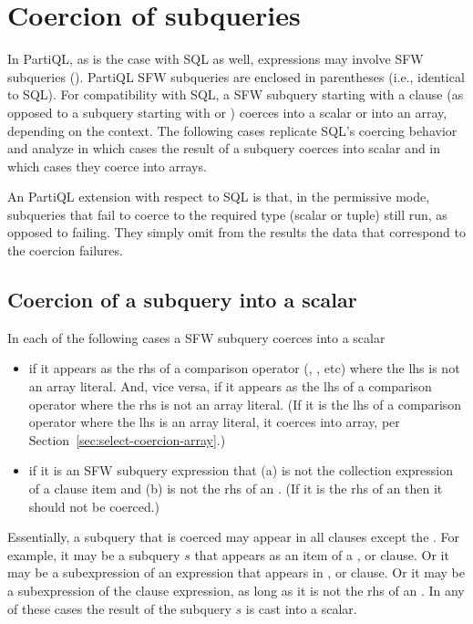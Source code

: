 \section{Coercion of subqueries} 
\label{sec:subquery-coercion}

In PartiQL, as is the case with SQL as well, expressions may involve SFW
subqueries (). PartiQL SFW subqueries are enclosed in
parentheses (i.e., identical to SQL). For compatibility with SQL, a SFW subquery
starting with a  clause (as opposed to a subquery starting with
 or ) coerces into a scalar or into an array,
depending on the context. The following cases replicate SQL's coercing behavior
and analyze in which cases the result of a subquery coerces into scalar and in
which cases they coerce into arrays.

An PartiQL extension with respect to SQL is that, in the permissive mode,
subqueries that fail to coerce to the required type (scalar or tuple) still run,
as opposed to failing. They simply omit from the results the data that
correspond to the coercion failures.

\subsection{Coercion of a  subquery into a scalar}
\label{sec:select-coercion-scalar}
In each of the following cases a SFW subquery coerces into a scalar
\begin{itemize}
\item if it appears as the rhs of a comparison operator (\gt{=}, \gt{>}, etc)
where the lhs is not an array literal. And, vice versa, if it appears as the lhs
of a comparison operator where the rhs is not an array literal. (If it is the
lhs of a comparison operator where the lhs is an array literal, it coerces into
array, per Section~\ref{sec:select-coercion-array}.)
\item if it is an SFW subquery expression that (a) is not the collection
expression of a  clause item and (b) is not the rhs of an . (If
it is the rhs of an  then it should not be coerced.)
\end{itemize}

Essentially, a subquery that is coerced may appear in all clauses except the
. For example, it may be a  subquery $s$ that appears as an
item of a ,  or  clause. Or it may
be a subexpression of an expression that appears in ,  or  clause. Or it may be a subexpression of the
 clause expression, as long as it is not the rhs of an . In any
of these cases the result of the subquery $s$ is cast into a scalar. 

